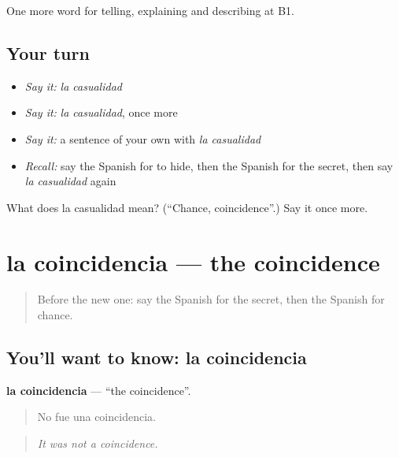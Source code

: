 \begin{grammarlens}[title={What you've built}]
One more word for telling, explaining and describing at B1.
\end{grammarlens}

\subsection*{Your turn}
\begin{itemize}
\raggedright
  \item \emph{Say it:} \emph{la casualidad}
  \item \emph{Say it:} \emph{la casualidad}, once more
  \item \emph{Say it:} a sentence of your own with \emph{la casualidad}
  \item \emph{Recall:} say the Spanish for to hide, then the Spanish for the secret, then say \emph{la casualidad} again
\end{itemize}

\begin{tcolorbox}[breakable,colback=teal!4,colframe=teal!35!black,title={Before you move on}]
What does la casualidad mean? (\textquotedblleft{}Chance, coincidence\textquotedblright{}.) Say it once more.
\end{tcolorbox}
\section[la coincidencia]{la coincidencia — the coincidence}

\label{lesson:ES-C533-coincidencia}



\begin{quote}
Before the new one: say the Spanish for the secret, then the Spanish for chance.
\end{quote}

\subsection*{You'll want to know: la coincidencia}
\textbf{la coincidencia} — \textquotedblleft{}the coincidence\textquotedblright{}.

\begin{quote}
No fue una coincidencia.
\end{quote}

\begin{quote}
\emph{It was not a coincidence.}
\end{quote}

